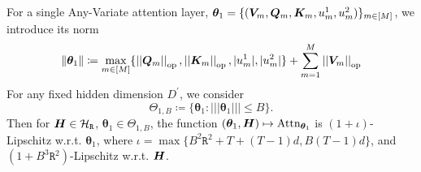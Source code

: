 \begin{lemma}\label{lem:attn-lipschitz}
    For a single Any-Variate attention layer, $\bm{\theta}_1 = \{(\bm{V}_m, \bm{Q}_m, \bm{K}_m, u^1_m, u^2_m)\}_{m\in[M]}$, we introduce its norm
    \begin{equation*}
        \Vert
        \bm{\theta}_1
        \Vert
        \coloneqq
        \max_{m\in[M]}
        \{ 
            \left\lvert \left\lvert\bm{Q}_m\right\rvert \right\rvert_{\text{op}},
            \left\lvert \left\lvert\bm{K}_m\right\rvert \right\rvert_{\text{op}},
            \vert u^1_m \vert,
            \vert u^2_m \vert
        \}
        +
        \sum_{m=1}^M \left\lvert \left\lvert\bm{V}_m\right\rvert \right\rvert_{\text{op}}
    \end{equation*}
    For any fixed hidden dimension $D^\prime$, we consider
    \begin{equation*}
        \Theta_{1, B}
        \coloneqq
        \{ 
        \bm{\theta}_{1}
        :
        \lvert \lvert \lvert
        \bm{\theta}_1
        \rvert \rvert \rvert
        \leq 
        B
        \}.
    \end{equation*}
    Then for $\bm{H} \in \mathcal{H}_{\mathtt{R}}$, $\bm{\theta}_1 \in \Theta_{1, B}$, the function 
    $(\bm{\theta}_1, \bm{H}) \mapsto \text{Attn}_{ \bm{\theta}_1}$ is $(1+\iota)$-Lipschitz w.r.t. $\bm{\theta}_1$, where $\iota = \max \{  B^2\mathtt{R}^2 +T + (T-1)d, B(T-1)d  \}$,
    and $(1 + B^3 \mathtt{R}^2)$-Lipschitz w.r.t. $\bm{H}$.
\end{lemma}


